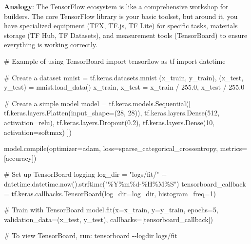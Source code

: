 \documentclass[
  letterpaper,
  DIV=11,
  numbers=noendperiod]{scrreprt}
\newenvironment{Shaded}{\begin{snugshade}}{\end{snugshade}}
\newcommand{\BuiltInTok}[1]{\textcolor[rgb]{0.00,0.23,0.31}{#1}}
\newcommand{\CommentTok}[1]{\textcolor[rgb]{0.37,0.37,0.37}{#1}}
\newcommand{\DecValTok}[1]{\textcolor[rgb]{0.68,0.00,0.00}{#1}}
\newcommand{\FloatTok}[1]{\textcolor[rgb]{0.68,0.00,0.00}{#1}}
\newcommand{\ImportTok}[1]{\textcolor[rgb]{0.00,0.46,0.62}{#1}}
\newcommand{\NormalTok}[1]{\textcolor[rgb]{0.00,0.23,0.31}{#1}}
\newcommand{\OperatorTok}[1]{\textcolor[rgb]{0.37,0.37,0.37}{#1}}
\newcommand{\SpecialCharTok}[1]{\textcolor[rgb]{0.37,0.37,0.37}{#1}}
\newcommand{\StringTok}[1]{\textcolor[rgb]{0.13,0.47,0.30}{#1}}
\begin{document}
\textbf{Analogy}: The TensorFlow ecosystem is like a comprehensive
workshop for builders. The core TensorFlow library is your basic
toolset, but around it, you have specialized equipment (TFX, TF.js, TF
Lite) for specific tasks, materials storage (TF Hub, TF Datasets), and
measurement tools (TensorBoard) to ensure everything is working
correctly.

\begin{Shaded}
\begin{Highlighting}[]
\CommentTok{\# Example of using TensorBoard}
\ImportTok{import}\NormalTok{ tensorflow }\ImportTok{as}\NormalTok{ tf}
\ImportTok{import}\NormalTok{ datetime}

\CommentTok{\# Create a dataset}
\NormalTok{mnist }\OperatorTok{=}\NormalTok{ tf.keras.datasets.mnist}
\NormalTok{(x\_train, y\_train), (x\_test, y\_test) }\OperatorTok{=}\NormalTok{ mnist.load\_data()}
\NormalTok{x\_train, x\_test }\OperatorTok{=}\NormalTok{ x\_train }\OperatorTok{/} \FloatTok{255.0}\NormalTok{, x\_test }\OperatorTok{/} \FloatTok{255.0}

\CommentTok{\# Create a simple model}
\NormalTok{model }\OperatorTok{=}\NormalTok{ tf.keras.models.Sequential([}
\NormalTok{  tf.keras.layers.Flatten(input\_shape}\OperatorTok{=}\NormalTok{(}\DecValTok{28}\NormalTok{, }\DecValTok{28}\NormalTok{)),}
\NormalTok{  tf.keras.layers.Dense(}\DecValTok{512}\NormalTok{, activation}\OperatorTok{=}\StringTok{\textquotesingle{}relu\textquotesingle{}}\NormalTok{),}
\NormalTok{  tf.keras.layers.Dropout(}\FloatTok{0.2}\NormalTok{),}
\NormalTok{  tf.keras.layers.Dense(}\DecValTok{10}\NormalTok{, activation}\OperatorTok{=}\StringTok{\textquotesingle{}softmax\textquotesingle{}}\NormalTok{)}
\NormalTok{])}

\NormalTok{model.}\BuiltInTok{compile}\NormalTok{(optimizer}\OperatorTok{=}\StringTok{\textquotesingle{}adam\textquotesingle{}}\NormalTok{,}
\NormalTok{              loss}\OperatorTok{=}\StringTok{\textquotesingle{}sparse\_categorical\_crossentropy\textquotesingle{}}\NormalTok{,}
\NormalTok{              metrics}\OperatorTok{=}\NormalTok{[}\StringTok{\textquotesingle{}accuracy\textquotesingle{}}\NormalTok{])}

\CommentTok{\# Set up TensorBoard logging}
\NormalTok{log\_dir }\OperatorTok{=} \StringTok{"logs/fit/"} \OperatorTok{+}\NormalTok{ datetime.datetime.now().strftime(}\StringTok{"\%Y\%m}\SpecialCharTok{\%d}\StringTok{{-}\%H\%M\%S"}\NormalTok{)}
\NormalTok{tensorboard\_callback }\OperatorTok{=}\NormalTok{ tf.keras.callbacks.TensorBoard(log\_dir}\OperatorTok{=}\NormalTok{log\_dir, histogram\_freq}\OperatorTok{=}\DecValTok{1}\NormalTok{)}

\CommentTok{\# Train with TensorBoard}
\NormalTok{model.fit(x}\OperatorTok{=}\NormalTok{x\_train, }
\NormalTok{          y}\OperatorTok{=}\NormalTok{y\_train, }
\NormalTok{          epochs}\OperatorTok{=}\DecValTok{5}\NormalTok{, }
\NormalTok{          validation\_data}\OperatorTok{=}\NormalTok{(x\_test, y\_test), }
\NormalTok{          callbacks}\OperatorTok{=}\NormalTok{[tensorboard\_callback])}

\CommentTok{\# To view TensorBoard, run: tensorboard {-}{-}logdir logs/fit}
\end{Highlighting}
\end{Shaded}
\end{document}
